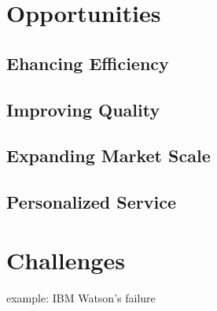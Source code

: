 \documentclass[fleqn,10pt]{SelfArx} %
\begin{document}







\section{Opportunities}

\subsection{Ehancing Efficiency}
\subsection{Improving Quality}
\subsection{Expanding Market Scale}
\subsection{Personalized Service}

\section{Challenges}
example: IBM Watson's failure
\end{document}
